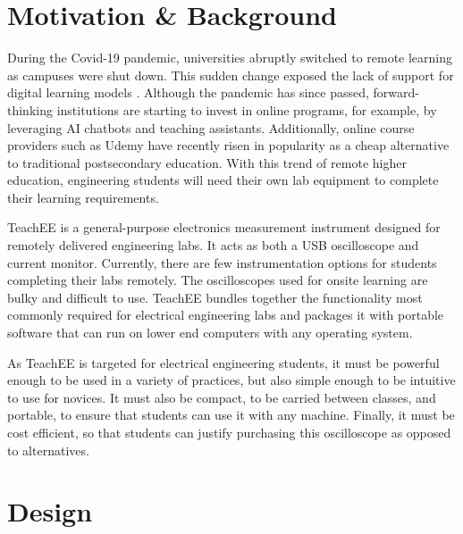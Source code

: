 \documentclass[letterpaper,11pt]{article}
\begin{document}
\section{Motivation \& Background}
During the Covid-19 pandemic, universities abruptly switched to remote learning
as campuses were shut down. This sudden change exposed the lack of support for
digital learning models \cite{online_learning}. Although the pandemic has since
passed, forward-thinking institutions are starting to invest in online programs,
for example, by leveraging AI chatbots and teaching assistants. Additionally,
online course providers such as Udemy have recently risen in popularity as a
cheap alternative to traditional postsecondary education. With this trend of
remote higher education, engineering students will need their own lab equipment
to complete their learning requirements.

TeachEE is a general-purpose electronics measurement instrument
designed for remotely delivered engineering labs. It acts as both a
USB oscilloscope and current monitor. Currently, there are few instrumentation
options for students completing their labs remotely. The oscilloscopes used for
onsite learning are bulky and difficult to use. TeachEE bundles
together the functionality most commonly required for electrical engineering
labs and packages it with portable software that can run on lower end computers
with any operating system.

As TeachEE is targeted for electrical engineering students, it must be powerful
enough to be used in a variety of practices, but also simple enough to
be intuitive to use for novices. It must also be compact, to be carried between classes,
and portable, to ensure that students can use it with any machine. Finally, it must be
cost efficient, so that students can justify purchasing this oscilloscope
as opposed to alternatives.

\section{Design}
\end{document}
